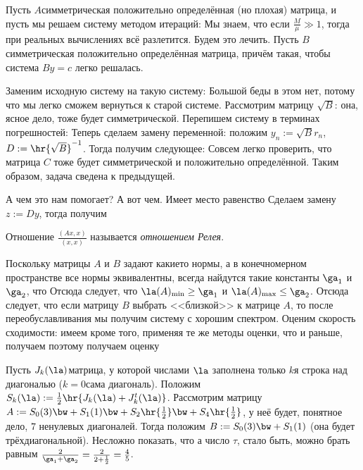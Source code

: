 \documentclass[a4paper]{article}
\begin{document}
Пусть $A$\т симметрическая положительно определённая (но плохая) матрица, и пусть мы решаем
систему методом итераций:
Мы знаем, что если $\frac{M}{\mu} \gg 1$, тогда при реальных вычислениях
всё разлетится. Будем это лечить. Пусть $B$\т симметрическая положительно определённая матрица,
причём такая, чтобы система $By = c$ легко решалась.

Заменим исходную систему на такую систему:
Большой беды в этом нет, потому что мы легко сможем вернуться к старой системе.
Рассмотрим матрицу $\sqrt{B}$: она, ясное дело, тоже будет симметрической.
Перепишем систему в терминах погрешностей:
Теперь сделаем замену переменной: положим $y_n := \sqrt{B} r_n$, $D := \hr{\sqrt{B}}^{-1}$.
Тогда получим следующее:
Совсем легко проверить, что матрица $C$ тоже будет симметрической и положительно определённой.
Таким образом, задача сведена к предыдущей.

А чем это нам помогает? А вот чем. Имеет место равенство
Сделаем замену $z := Dy$, тогда получим

\begin{df}
Отношение $\frac{(Ax,x)}{(x,x)}$ называется \emph{отношением Релея}.
\end{df}

Поскольку матрицы $A$ и $B$ задают какие\д то нормы, а в конечномерном пространстве все нормы эквивалентны,
всегда найдутся такие константы $\ga_1$ и $\ga_2$, что
Отсюда следует, что $\la(A)_{\min} \ge \ga_1$ и $\la(A)_{\max} \le \ga_2$.
Отсюда следует, что если матрицу $B$ выбрать <<близкой>> к матрице $A$, то после переобуславливания
мы получим систему с хорошим спектром. Оценим скорость сходимости:
имеем
кроме того, применяя те же методы оценки, что и раньше,
получаем
поэтому получаем оценку

\begin{ex}
Пусть $J_k(\la)$\т матрица, у которой числами $\la$ заполнена только $k$\д я строка над диагональю ($k = 0$\т сама диагональ).
Положим $S_k(\la) := \frac{1}{2}\hr{J_k(\la) + J_k^t(\la)}$.
Рассмотрим матрицу $A := S_0(3) \bw+ S_1(1) \bw+ S_2\hr{\frac12} \bw+ S_4\hr{\frac12}$, у неё будет, понятное дело,
$7$ ненулевых диагоналей. Тогда положим $B := S_0(3) \bw+ S_1(1)$ (она будет трёхдиагональной).
Несложно показать, что
а число $\tau$, стало быть, можно брать равным $\frac{2}{\ga_1 + \ga_2} = \frac{2}{2 + \frac12} = \frac45$.
\end{ex}
\end{document}
